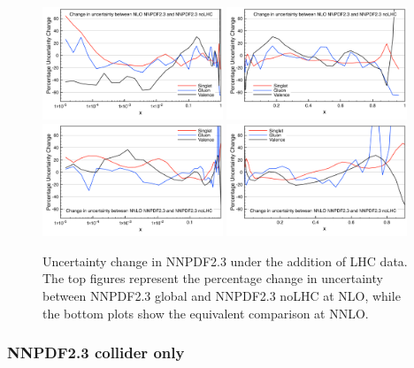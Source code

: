 \begin{figure}[h!]
\centering
\includegraphics[width=0.48\textwidth]{6-LHCimpact/figs/NLOlogUnc.pdf}
\includegraphics[width=0.48\textwidth]{6-LHCimpact/figs/NLOlinUnc.pdf}\\
\includegraphics[width=0.48\textwidth]{6-LHCimpact/figs/NNLOlogUnc.pdf}
\includegraphics[width=0.48\textwidth]{6-LHCimpact/figs/NNLOlinUnc.pdf}
\caption[Uncertainty change in NNPDF2.3 under the addition of LHC data]{Uncertainty change in NNPDF2.3 under the addition of LHC data. The top figures represent the percentage change in uncertainty between NNPDF2.3 global and NNPDF2.3 noLHC at NLO, while the bottom plots show the equivalent comparison at NNLO.}
\label{fig:23vs23noLHCunc}
\end{figure}



\subsubsection{NNPDF2.3 collider only}

